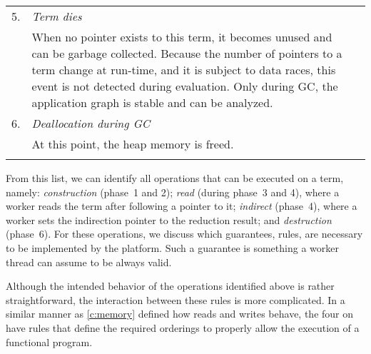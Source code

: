 \begin{tabular}{P}
5.  & \emph{Term dies} &  \\
	& When no pointer exists to this term, it becomes unused and can be garbage collected.
	  Because the number of pointers to a term change at run-time, and it is subject to data races, this event is not detected during evaluation.
	  Only during \ac{GC}, the application graph is stable and can be analyzed. & \\
6.  & \emph{Deallocation during \ac{GC}} &  \\
	& At this point, the heap memory is freed. & \\
	& &  \\
\end{tabular}\vspace{-.5em}%

From this list, we can identify all operations that can be executed on a term, namely:
\emph{construction} (phase~1 and 2);
\emph{read} (during phase~3 and 4), where a worker reads the term after following a pointer to it;
\emph{indirect} (phase~4), where a worker sets the indirection pointer to the reduction result; and
\emph{destruction} (phase~6).
For these operations, we discuss which guarantees, \ie rules, are necessary to be implemented by the platform.
Such a guarantee is something a worker thread can assume to be always valid.

Although the intended behavior of the operations identified above is rather straightforward, the interaction between these rules is more complicated.
In a similar manner as \cref{c:memory} defined how reads and writes behave, the four  on \lterms have rules that define the required orderings to properly allow the execution of a functional program.

